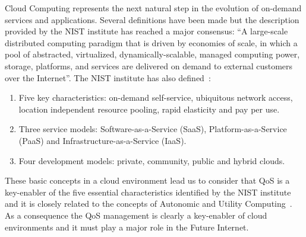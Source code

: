 Cloud Computing represents the next natural step in the evolution of on-demand services and applications. Several definitions have been made but the description~\cite{mell2011nist} 
provided by the NIST institute has reached a major consensus:  ``A large-scale distributed computing paradigm that is driven by economies of scale, in which a pool of 
abstracted, virtualized, dynamically-scalable, managed computing power, storage, platforms, and services are delivered on demand to external customers over the Internet''. 
The NIST institute has also defined~\cite{mell2011nist,Garcia-Sanchez:2010:ASS:1852403.1852409}: 
\begin{enumerate}
 \item Five key characteristics: on-demand self-service, ubiquitous network access, location independent resource pooling, rapid elasticity and pay per use.
 \item Three service models: Software-as-a-Service (SaaS), Platform-as-a-Service (PaaS) and Infrastructure-as-a-Service (IaaS).
 \item Four development models: private, community, public and hybrid clouds. 
\end{enumerate}

These basic concepts in a cloud environment lead us to consider that QoS is a key-enabler of the five essential characteristics identified by 
the NIST institute and it is closely related to the concepts of Autonomic and Utility Computing~\cite{Huebscher:2008:SAC:1380584.1380585}. As a consequence the QoS management 
is clearly a key-enabler of cloud environments and it must play a major role in the Future Internet.

